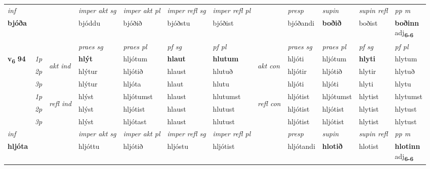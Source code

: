 \begin{longtable}[l]{X>{\footnotesize\itshape}llXXXXlXXXX}
\cmidrule{4-7}
   {\textit{inf}} & &  & \textit{imper akt sg} & \textit{imper akt pl} & \textit{imper refl sg} & \textit{imper refl pl} && \textit{presp} & \textit{supin} & \textit{supin refl} & \textit{pp m} \\*
  {\textbf{bjóða}} & && bjóddu  & bjóðið & bjóðstu & bjóðist && bjóðandi &  \textbf{boðið} & boðist & \specialcell{\textbf{boðinn} \\ adj\textbf{\textsubscript{6-6}}} \\*

\midrule

 & &   & \textit{praes sg}  & \textit{praes pl}    & \textit{ pf sg} & \textit{pf pl} & & \textit{praes sg}  & \textit{praes pl}    & \textit{pf sg} & \textit{pf pl }  \\ \cmidrule{4-7} \cmidrule{9-12}
 \multirow{2}{*}{{{\textbf{v{\textsubscript{6}}} \Large{\textbf{94}}}}}  & 1p & \multirow{3}{*}{\begin{turn}{90}\textit{akt ind}\end{turn}} & \textbf{hlýt} & hljótum & \textbf{hlaut} & \textbf{hlutum} & \multirow{3}{*}{\begin{turn}{90}\textit{akt con}\end{turn}} &hljóti & hljótum & \textbf{hlyti} & hlytum\\*
 & 2p &  &  hlýtur  & hljótið & hlaust & hlutuð & & hljótir & hljótið & hlytir & hlytuð \\*
 & 3p &  & hlýtur & hljóta & hlaut & hlutu & & hljóti & hljóti& hlyti & hlytu \\*
\cmidrule{4-7} \cmidrule{9-12}
 & 1p & \multirow{3}{*}{\begin{turn}{90}\textit{refl ind}\end{turn}}  & hlýst & hljótumst & hlaust & hlutumst & \multirow{3}{*}{\begin{turn}{90}\textit{refl con}\end{turn}}  &hljótist & hljótumst & hlytist & hlytumst \\*
 & 2p &  & hlýst & hljótist & hlaust & hlutust & &hljótist & hljótist & hlytist & hlytust \\*
 & 3p  & & hlýst & hljótast & hlaust & hlutust & & hljótist & hljótist& hlytist & hlytust \\*
\cmidrule{4-7} \cmidrule{9-12}

   {\textit{inf}} & &  & \textit{imper akt sg} & \textit{imper akt pl} & \textit{imper refl sg} & \textit{imper refl pl} && \textit{presp} & \textit{supin} & \textit{supin refl} & \textit{pp m} \\*
  {\textbf{hljóta}} & && hljóttu  & hljótið & hljóstu & hljótist && hljótandi &  \textbf{hlotið} & hlotist & \specialcell{\textbf{hlotinn} \\ adj\textbf{\textsubscript{6-6}}} \\*


\end{longtable}
